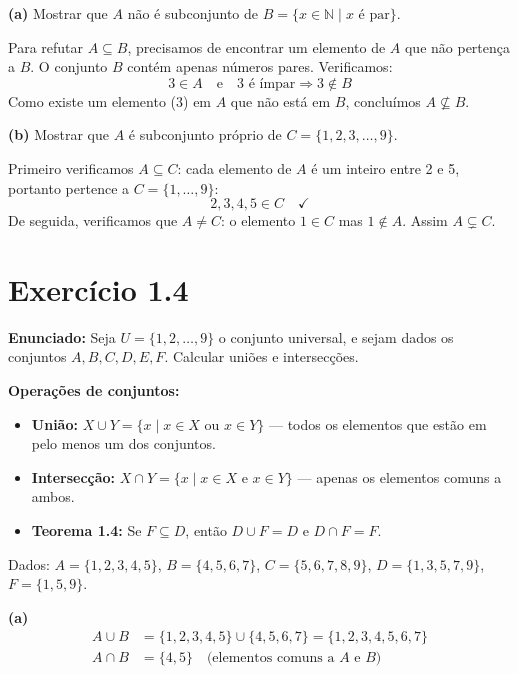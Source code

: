 \documentclass[12pt,a4paper]{article}
\begin{document}
\textbf{(a)} Mostrar que $A$ não é subconjunto de $B = \{x \in \mathbb{N} \mid x \text{ é par}\}$.

Para refutar $A \subseteq B$, precisamos de encontrar um elemento de $A$ que não pertença a $B$. O conjunto $B$ contém apenas números pares. Verificamos:
\[
3 \in A \quad \text{e} \quad 3 \text{ é ímpar} \Rightarrow 3 \notin B
\]
Como existe um elemento ($3$) em $A$ que não está em $B$, concluímos $A \not\subseteq B$.

\textbf{(b)} Mostrar que $A$ é subconjunto próprio de $C = \{1, 2, 3, \ldots, 9\}$.

Primeiro verificamos $A \subseteq C$: cada elemento de $A$ é um inteiro entre 2 e 5, portanto pertence a $C = \{1,\ldots,9\}$:
\[
2, 3, 4, 5 \in C \quad \checkmark
\]
De seguida, verificamos que $A \neq C$: o elemento $1 \in C$ mas $1 \notin A$. Assim $A \subsetneq C$.

\section*{Exercício 1.4}

\textbf{Enunciado:} Seja $U = \{1,2,\ldots,9\}$ o conjunto universal, e sejam dados os conjuntos $A, B, C, D, E, F$. Calcular uniões e intersecções.

\begin{teoribox}
\textbf{Operações de conjuntos:}
\begin{itemize}
  \item \textbf{União:} $X \cup Y = \{x \mid x \in X \text{ ou } x \in Y\}$ --- todos os elementos que estão em pelo menos um dos conjuntos.
  \item \textbf{Intersecção:} $X \cap Y = \{x \mid x \in X \text{ e } x \in Y\}$ --- apenas os elementos comuns a ambos.
  \item \textbf{Teorema 1.4:} Se $F \subseteq D$, então $D \cup F = D$ e $D \cap F = F$.
\end{itemize}
\end{teoribox}

Dados: $A = \{1,2,3,4,5\}$, $B = \{4,5,6,7\}$, $C = \{5,6,7,8,9\}$, $D = \{1,3,5,7,9\}$, $F = \{1,5,9\}$.

\textbf{(a)}
\begin{align*}
A \cup B &= \{1,2,3,4,5\} \cup \{4,5,6,7\} = \{1,2,3,4,5,6,7\} \\
A \cap B &= \{4,5\} \quad \text{(elementos comuns a } A \text{ e } B\text{)}
\end{align*}
\end{document}
